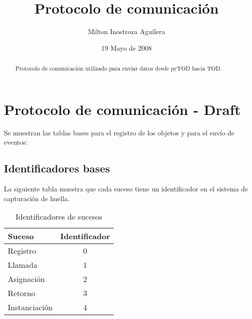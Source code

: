 \documentclass[10pt,a4paper]{article}
\begin{document}
\renewcommand{\contentsname}{Indice} 
\renewcommand\listfigurename{Lista de Figuras}
\renewcommand\listtablename{Lista de Tablas}
\newcommand\bibname{Bibliografía}
\renewcommand{\refname}{Bibliografía}
\renewcommand\indexname{Indice alfabético}
\renewcommand\figurename{Figura}
\renewcommand\tablename{Tabla}
\renewcommand\partname{Parte}
\newcommand\chaptername{Capítulo}
\renewcommand\appendixname{Apéndice}
\renewcommand\abstractname{Resumen}

\title{Protocolo de comunicación}
\author{Milton Inostroza Aguilera}
\date{19 Mayo de 2008}
\clearpage
\maketitle

\begin{abstract}

Protocolo de comunicación utilizado para envíar datos desde pyTOD hacia TOD.

\end{abstract}
\newpage
\listoftables
\newpage

\section{Protocolo de comunicación - Draft}

Se muestran las tablas bases para el registro de los objetos y para el envío de eventos:

\subsection{Identificadores bases}

La siguiente tabla muestra que cada suceso tiene un identificador en el sistema de capturación de huella.
\begin{table}[!h]
\begin{center}
\begin{tabular}{|l | c |}
\hline
Suceso & Identificador\\
\hline
Registro & 0\\
\hline
Llamada & 1\\
\hline
Asignación & 2\\
\hline
Retorno & 3\\
\hline
Instanciación & 4\\
\hline
\end{tabular}
\caption{Identificadores de sucesos} 
\end{center}
\end{table}
\end{document}
